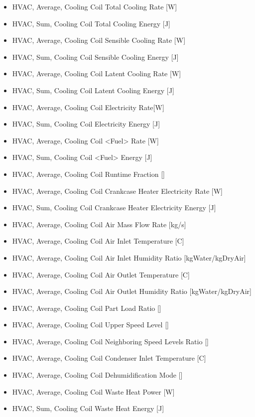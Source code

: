 \begin{itemize}
\item HVAC, Average, Cooling Coil Total Cooling Rate {[}W{]}
\item HVAC, Sum, Cooling Coil Total Cooling Energy {[}J{]}
\item HVAC, Average, Cooling Coil Sensible Cooling Rate {[}W{]}
\item HVAC, Sum, Cooling Coil Sensible Cooling Energy {[}J{]}
\item HVAC, Average, Cooling Coil Latent Cooling Rate {[}W{]}
\item HVAC, Sum, Cooling Coil Latent Cooling Energy {[}J{]}
\item HVAC, Average, Cooling Coil Electricity Rate{[}W{]}
\item HVAC, Sum, Cooling Coil Electricity Energy {[}J{]}
\item HVAC, Average, Cooling Coil <Fuel> Rate {[}W{]}
\item HVAC, Sum, Cooling Coil <Fuel> Energy {[}J{]}
\item HVAC, Average, Cooling Coil Runtime Fraction {[]}
\item HVAC, Average, Cooling Coil Crankcase Heater Electricity Rate {[}W{]}
\item HVAC, Sum, Cooling Coil Crankcase Heater Electricity Energy {[}J{]}
\item HVAC, Average, Cooling Coil Air Mass Flow Rate {[}kg/s{]}
\item HVAC, Average, Cooling Coil Air Inlet Temperature {[}C{]}
\item HVAC, Average, Cooling Coil Air Inlet Humidity Ratio {[}kgWater/kgDryAir{]}
\item HVAC, Average, Cooling Coil Air Outlet Temperature {[}C{]}
\item HVAC, Average, Cooling Coil Air Outlet Humidity Ratio {[}kgWater/kgDryAir{]}
\item HVAC, Average, Cooling Coil Part Load Ratio {[]}
\item HVAC, Average, Cooling Coil Upper Speed Level {[]}
\item HVAC, Average, Cooling Coil Neighboring Speed Levels Ratio {[]}
\item HVAC, Average, Cooling Coil Condenser Inlet Temperature {[}C{]}
\item HVAC, Average, Cooling Coil Dehumidification Mode {[]}
\item HVAC, Average, Cooling Coil Waste Heat Power {[}W{]}
\item HVAC, Sum, Cooling Coil Waste Heat Energy {[}J{]}

\end{itemize}
